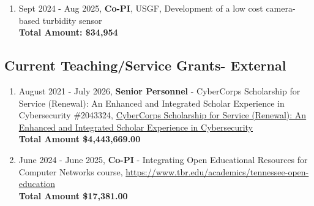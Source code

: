 \begin{enumerate}
\item Sept 2024 - Aug 2025, \textbf{Co-PI}, USGF, Development of a low cost camera-based turbidity sensor \\ \textbf{Total Amount: \$34,954}




\end{enumerate}

\hspace{2em}


\subsection{Current Teaching/Service Grants- External}
\begin{enumerate}

\item August 2021 - July 2026, \textbf{Senior Personnel} - CyberCorps Scholarship for Service (Renewal): An Enhanced and Integrated Scholar Experience in Cybersecurity \#2043324, \href{https://www.nsf.gov/awardsearch/showAward?AWD_ID=2043324&HistoricalAwards=false}{CyberCorps Scholarship for Service (Renewal): An Enhanced and Integrated Scholar Experience in Cybersecurity} \\\textbf{Total Amount \$4,443,669.00}

\item June 2024 - June 2025, \textbf{Co-PI} - Integrating Open Educational Resources for Computer Networks course, \href{https://www.tbr.edu/academics/tennessee-open-education}{https://www.tbr.edu/academics/tennessee-open-education} \\\textbf{Total Amount \$17,381.00}

\end{enumerate}





